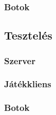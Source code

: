 \documentclass[twoside, a4paper, 12pt]{article}
\begin{document}
\subsubsection{Botok}
\lipsum[3]















\subsection{Tesztelés}

\subsubsection{Szerver}
\lipsum[1]

\subsubsection{Játékkliens}
\lipsum[2]

\subsubsection{Botok}
\lipsum[3]











































\newpage
\end{document}

